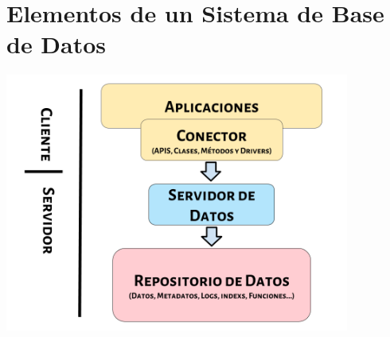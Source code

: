 \documentclass[12pt, fleqn]{report}                             %
\theoremstyle{break}                                            %
\begin{document}
        \clearpage
        \section{Elementos de un Sistema de Base de Datos}

            \includegraphics[width=0.85\textwidth]{DiagramaPartes.png}
\end{document}
